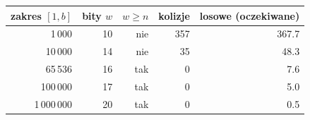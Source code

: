 \begin{tabular}{rrrrr}\toprule
zakres $[1,b]$ & bity $w$ & $w \ge n$ & kolizje & losowe (oczekiwane) \\ \midrule
1\,000 & 10 & nie & 357 & 367.7 \\
10\,000 & 14 & nie & 35 & 48.3 \\
65\,536 & 16 & tak & 0 & 7.6 \\
100\,000 & 17 & tak & 0 & 5.0 \\
1\,000\,000 & 20 & tak & 0 & 0.5 \\
\bottomrule\end{tabular}
